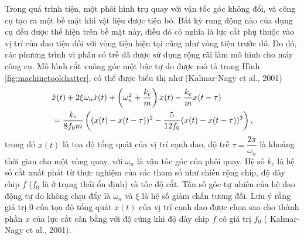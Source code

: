 Trong quá trình tiện, một phôi hình trụ quay với vận tốc góc không đổi, và công cụ tạo ra một bề mặt khi vật liệu được tiện bỏ. Bất kỳ rung động nào của dụng cụ đều được thể hiện trên bề mặt này, điều đó có nghĩa là lực cắt phụ thuộc vào vị trí của dao tiện đối với vòng tiện hiện tại cũng như vòng tiện trước đó. Do đó, các phương trình vi phân có trễ đã được sử dụng rộng rãi làm mô hình cho máy công cụ. Mô hình cắt vuông góc một bậc tự do được mô tả trong Hình \ref{fig:machinetoolchatter}, có thể được biểu thị như (Kalmar-Nagy et al., 2001)
%
\begin{align}\label{turning process}
&\ddot{x}(t) + 2 \xi \omega_n  \dot{x}(t) + \left( \omega_n^2 + \dfrac{k_c}{m}\right) x(t) - \dfrac{k_c}{m} x(t-\tau ) \notag \\
& = \dfrac{k_c}{8 f_0 m} \left( (x(t) - x(t-\tau) )^2 - \dfrac{5}{12 f_0} (x(t) - x(t-\tau) )^3 \right),  
\end{align}
%
trong đó $x (t)$ là tọa độ tổng quát của vị trí cạnh dao, độ trễ $\tau = \dfrac{2\pi}{\omega_n}$ là khoảng thời gian cho một vòng quay, với $\omega_n$ là vận tốc góc của phôi quay. Hệ số $k_c$ là hệ số cắt xuất phát từ thực nghiệm của các tham số như chiều rộng chip, độ dày chip $f$ ($f_0$  là ở trạng thái ổn định) và tốc độ cắt. Tần số góc tự nhiên của hệ dao động tự do không chịu đẩy là $\omega_n$ và $\xi$ là hệ số giảm chấn tương đối. Lưu ý rằng giá trị $0$ của tọa độ tổng quát $x(t)$ của vị trí cạnh dao được chọn sao cho thành phần $x$ của lực cắt cân bằng với độ cứng khi độ dày chip $f$ có giá trị $f_0$ ( Kalmar-Nagy et al., 2001).

